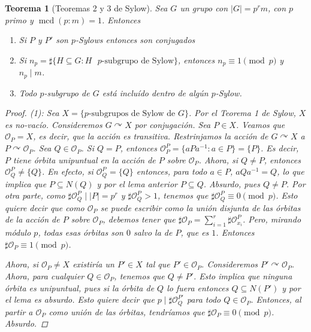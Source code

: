 \documentclass[12pt]{book}
\newtheorem{teo}{Teorema}[section]
\theoremstyle{definition}
\DeclareMathOperator{\mcd}{mcd}
\def\acts{\curvearrowright}
\begin{document}
\begin{teo}[Teoremas 2 y 3 de Sylow]
Sea $G$ un grupo con $|G|=p^r m$, con $p$ primo y $\mcd (p:m)=1$. Entonces \begin{enumerate}\item Si $P$ y $P'$ son $p$-Sylows entonces son conjugados \item Si $n_p = \sharp \{H\subseteq G : H \text{ }p\text{-subgrupo de Sylow}\}$, entonces $n_p\equiv 1\pmod{p}$ y $n_p\mid m$. \item Todo $p$-subgrupo de $G$ está incluído dentro de algún $p$-Sylow. \end{enumerate}
\begin{proof}

(\textit{1}): Sea $X=\{p\text{-subgrupos de Sylow de }G\}$. Por el Teorema 1 de Sylow, $X$ es no-vacío. Consideremos $G\acts X$ por conjugación. Sea $P\in X$. Veamos que $\mathcal{O}_P = X$, es decir, que la acción es transitiva. Restrinjamos la acción de $G\acts X$ a $P\acts \mathcal{O}_P$. Sea $Q \in \mathcal{O}_P$. Si $Q=P$, entonces $\mathcal{O}^P_P = \{aPa^{-1} : a\in P\} = \{P\}$. Es decir, $P$ tiene órbita unipuntual en la acción de $P$ sobre $\mathcal{O}_P$. Ahora, si $Q\neq P$, entonces $\mathcal{O}_Q^P \neq \{Q\}$. En efecto, si $\mathcal{O}_Q^P = \{Q\}$ entonces, para todo $a\in P$, $aQa^{-1} = Q$, lo que implica que $P\subseteq N(Q)$ y por el lema anterior $P\subseteq Q$. Absurdo, pues $Q\neq P$. Por otra parte, como $\sharp \mathcal{O}_Q^P \mid |P| = p^r$ y $\sharp \mathcal{O}_Q^P >1$, tenemos que $\sharp \mathcal{O}_Q^P \equiv 0 \pmod{p}$. Esto quiere decir que como $\mathcal{O}_P$ se puede escribir como la unión disjunta de las órbitas de la acción de $P$ sobre $\mathcal{O}_P$, debemos tener que $\sharp \mathcal{O}_P = \displaystyle\sum_{i=1}^{r} \sharp \mathcal{O}_{x_i}^{P}$. Pero, mirando módulo $p$, todas esas órbitas son $0$ salvo la de $P$, que es $1$. Entonces $\sharp  \mathcal{O}_P \equiv 1 \pmod{p}$.

Ahora, si $\mathcal{O}_P\neq X$ existiría un $P'\in X$ tal que $P'\in \mathcal{O}_P$. Consideremos $P'\acts \mathcal{O}_P$. Ahora, para cualquier $Q\in \mathcal{O}_P$, tenemos que $Q\neq P'$. Esto implica que ninguna órbita es unipuntual, pues si la órbita de $Q$ lo fuera entonces $Q\subseteq N(P')$ y por el lema es absurdo. Esto quiere decir que $p\mid \sharp\mathcal{O}_Q^{P'}$ para todo $Q\in\mathcal{O}_P$. Entonces, al partir a $\mathcal{O}_P$ como unión de las órbitas, tendríamos que $\sharp \mathcal{O}_P \equiv 0 \pmod{p}$. Absurdo.


\end{proof}
\end{teo}
\end{document}
